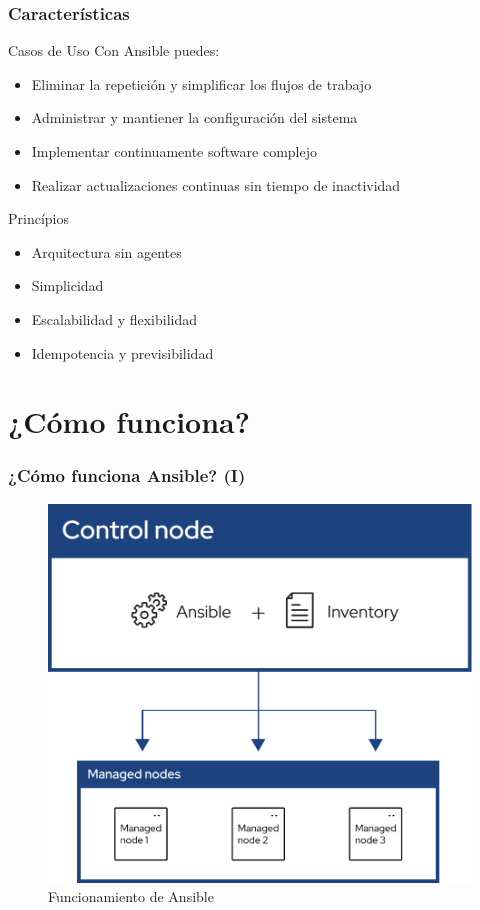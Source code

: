 \documentclass[
	11pt, %
]{beamer}
\begin{document}
\begin{frame}
	\frametitle{Características}

        \begin{exampleblock}{Casos de Uso}
        Con Ansible puedes:
		\begin{itemize}
		    \item Eliminar la repetición y simplificar los flujos de trabajo
                \item Administrar y mantiener la configuración del sistema
                \item Implementar continuamente software complejo
                \item Realizar actualizaciones continuas sin tiempo de inactividad
		\end{itemize}
	\end{exampleblock}

        \begin{exampleblock}{Princípios}
		\begin{itemize}
		    \item Arquitectura sin agentes
                \item Simplicidad
                \item Escalabilidad y flexibilidad
                \item Idempotencia y previsibilidad
		\end{itemize}
	\end{exampleblock}

\end{frame}

\section{¿Cómo funciona?}

\begin{frame}
	\frametitle{¿Cómo funciona Ansible? (I)}
	
	\begin{figure}
		\includegraphics[width=0.65\linewidth]{ansible_inv_start.pdf}
            \caption{Funcionamiento de Ansible}
	\end{figure}
	
\end{frame}
\end{document}
